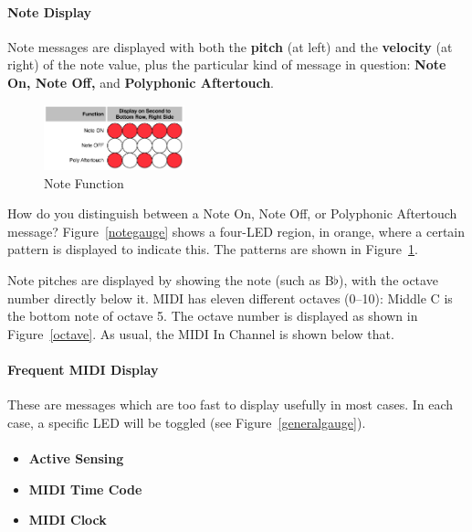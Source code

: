 \documentclass{article}
\begin{document}
\paragraph{Note Display}

Note messages are displayed with both the {\bf pitch} (at left) and the {\bf velocity} (at right) of the note value, plus the particular kind of message in question: {\bf Note On, Note Off,} and {\bf Polyphonic Aftertouch}.

\begin{figure}
\vspace{-1em}\includegraphics[width=1.6in]{notefunction.pdf}
\vspace{-2em}\caption{\small Note Function}\vspace{-2em}
\label{notefunction}
\end{figure}

How do you distinguish between a Note On, Note Off, or Polyphonic Aftertouch message?  Figure~\ref{notegauge} shows a four-LED region, in orange, where a certain pattern is displayed to indicate this.  The patterns are shown in Figure~\ref{notefunction}.

Note pitches are displayed by showing the note (such as B$\flat$), with the octave number directly below it.  MIDI has eleven different octaves (0--10): Middle C is the bottom note of octave 5.  The octave number is displayed as shown in Figure~\ref{octave}.  As usual, the MIDI In Channel is shown below that.


\paragraph{Frequent MIDI Display}  These are messages which are too fast to display usefully in most cases.  In each case, a specific LED will be toggled (see Figure~\ref{generalgauge}).

\paragraph{}\vspace{-2em}\begin{itemize}
\item {\bf Active Sensing}
\item {\bf MIDI Time Code}
\item {\bf MIDI Clock}
\end{itemize}
\end{document}

